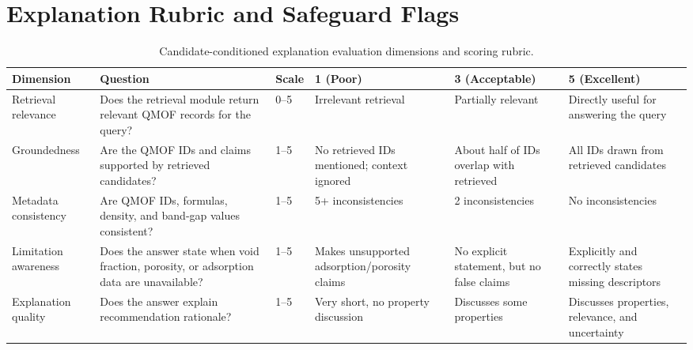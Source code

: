 \documentclass[12pt,a4paper]{article}
\begin{document}
\section*{Explanation Rubric and Safeguard Flags}

\begin{table}[H]
\centering
\caption{Candidate-conditioned explanation evaluation dimensions and scoring rubric.}
\scriptsize
\setlength{\tabcolsep}{3pt}
\begin{tabular}{p{2.5cm} p{3.6cm} p{1.0cm} p{2.1cm} p{2.1cm} p{2.5cm}}
\toprule
\textbf{Dimension} & \textbf{Question} & \textbf{Scale} & \textbf{1 (Poor)} & \textbf{3 (Acceptable)} & \textbf{5 (Excellent)}\\
\midrule
Retrieval relevance & Does the retrieval module return relevant QMOF records for the query? & 0--5 & Irrelevant retrieval & Partially relevant & Directly useful for answering the query\\
Groundedness & Are the QMOF IDs and claims supported by retrieved candidates? & 1--5 & No retrieved IDs mentioned; context ignored & About half of IDs overlap with retrieved & All IDs drawn from retrieved candidates\\
Metadata consistency & Are QMOF IDs, formulas, density, and band-gap values consistent? & 1--5 & 5+ inconsistencies & 2 inconsistencies & No inconsistencies\\
Limitation awareness & Does the answer state when void fraction, porosity, or adsorption data are unavailable? & 1--5 & Makes unsupported adsorption/porosity claims & No explicit statement, but no false claims & Explicitly and correctly states missing descriptors\\
Explanation quality & Does the answer explain recommendation rationale? & 1--5 & Very short, no property discussion & Discusses some properties & Discusses properties, relevance, and uncertainty\\
\bottomrule
\end{tabular}
\end{table}
\end{document}

